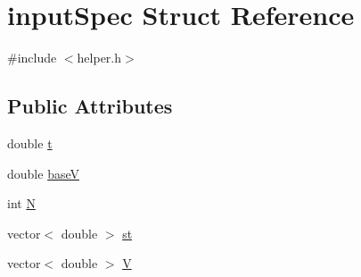 \hypertarget{structinputSpec}{\section{input\+Spec Struct Reference}
\label{structinputSpec}
}


{\ttfamily \#include $<$helper.\+h$>$}

\subsection*{Public Attributes}
\begin{DoxyCompactItemize}
\item 
double \hyperlink{structinputSpec_aa82b84b9475da88190cec34e78478908}{t}
\item 
double \hyperlink{structinputSpec_a6aeb08095e0d0094123108c8a74950a4}{base\+V}
\item 
int \hyperlink{structinputSpec_a25c637510c26633e00ac5f7704dce559}{N}
\item 
vector$<$ double $>$ \hyperlink{structinputSpec_ad88c6e86de04404e7f066b417284414b}{st}
\item 
vector$<$ double $>$ \hyperlink{structinputSpec_a99484aaff897f3d87d4bbfea19f61766}{V}
\end{DoxyCompactItemize}


